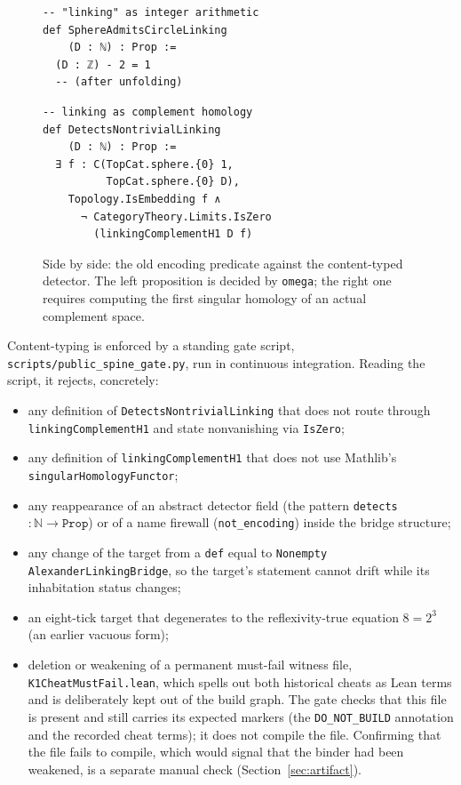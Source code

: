 \documentclass[11pt]{article}
\theoremstyle{definition}
\newcommand{\N}{\mathbb{N}}
\newcommand{\lean}[1]{\texttt{#1}}
\begin{document}
\begin{figure}[ht]
\begin{minipage}[t]{0.46\textwidth}
\begin{lstlisting}
-- "linking" as integer arithmetic
def SphereAdmitsCircleLinking
    (D : ℕ) : Prop :=
  (D : ℤ) - 2 = 1
  -- (after unfolding)
\end{lstlisting}
\end{minipage}\hfill
\begin{minipage}[t]{0.50\textwidth}
\begin{lstlisting}
-- linking as complement homology
def DetectsNontrivialLinking
    (D : ℕ) : Prop :=
  ∃ f : C(TopCat.sphere.{0} 1,
          TopCat.sphere.{0} D),
    Topology.IsEmbedding f ∧
      ¬ CategoryTheory.Limits.IsZero
        (linkingComplementH1 D f)
\end{lstlisting}
\end{minipage}
\caption{Side by side: the old encoding predicate against the content-typed detector. The left proposition is decided by \lean{omega}; the right one requires computing the first singular homology of an actual complement space.}
\label{fig:cheat}
\end{figure}

Content-typing is enforced by a standing gate script, \lean{scripts/public\_spine\_gate.py}, run in continuous integration. Reading the script, it rejects, concretely:

\begin{itemize}
\item any definition of \lean{DetectsNontrivialLinking} that does not route through \lean{linkingComplementH1} and state nonvanishing via \lean{IsZero};
\item any definition of \lean{linkingComplementH1} that does not use Mathlib's \lean{singularHomologyFunctor};
\item any reappearance of an abstract detector field (the pattern \lean{detects} $: \N \to \lean{Prop}$) or of a name firewall (\lean{not\_encoding}) inside the bridge structure;
\item any change of the target from a \lean{def} equal to \lean{Nonempty AlexanderLinkingBridge}, so the target's statement cannot drift while its inhabitation status changes;
\item an eight-tick target that degenerates to the reflexivity-true equation $8 = 2^3$ (an earlier vacuous form);
\item deletion or weakening of a permanent must-fail witness file, \lean{K1CheatMustFail.lean}, which spells out both historical cheats as Lean terms and is deliberately kept out of the build graph. The gate checks that this file is present and still carries its expected markers (the \lean{DO\_NOT\_BUILD} annotation and the recorded cheat terms); it does not compile the file. Confirming that the file fails to compile, which would signal that the binder had been weakened, is a separate manual check (Section~\ref{sec:artifact}).
\end{itemize}
\end{document}
